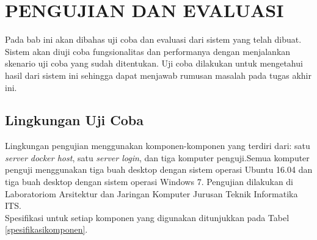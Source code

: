\chapter{PENGUJIAN DAN EVALUASI}
	Pada bab ini akan dibahas uji coba dan evaluasi dari sistem yang telah dibuat. Sistem akan diuji coba fungsionalitas dan performanya dengan menjalankan skenario uji coba yang sudah ditentukan. Uji coba dilakukan untuk mengetahui hasil dari sistem ini sehingga dapat menjawab rumusan masalah pada tugas akhir ini.    
	
\section{Lingkungan Uji Coba}
	Lingkungan pengujian menggunakan komponen-komponen yang terdiri dari: satu \textit{server docker host}, satu \textit{server login}, dan tiga komputer penguji.Semua komputer penguji menggunakan tiga buah desktop dengan sistem operasi Ubuntu 16.04 dan tiga buah desktop dengan sistem operasi Windows 7. Pengujian dilakukan di Laboratoriom Arsitektur dan Jaringan Komputer Jurusan Teknik Informatika ITS. \\
    \indent Spesifikasi untuk setiap komponen yang digunakan ditunjukkan pada Tabel \ref{spesifikasikomponen}.
